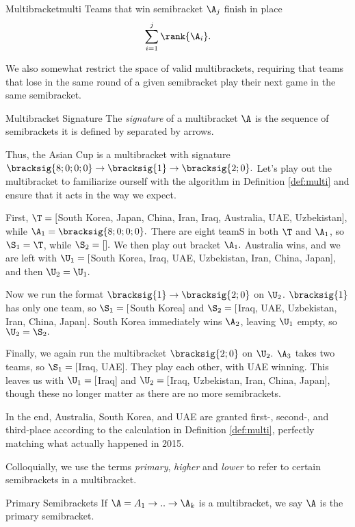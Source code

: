{\begin{definition}{Multibracket}{multi}
        Teams that win semibracket $\A_j$ finish in place $$\sum_{i=1}^{j} \rank{\A_i}.$$

        We also somewhat restrict the space of valid multibrackets, requiring that teams that lose in the same round of a given semibracket play their next game in the same semibracket.
    \end{definition}

    \begin{definition}{Multibracket Signature}{}
        The \textit{signature} of a multibracket $\A$ is the sequence of semibrackets it is defined by separated by arrows.
    \end{definition}

    Thus, the Asian Cup is a multibracket with signature $\bracksig{8;0;0;0} \to \bracksig{1} \to \bracksig{2;0}.$ Let's play out the multibracket to familiarize ourself with the algorithm in Definition \ref{def:multi} and ensure that it acts in the way we expect.

    First, $\T = [$South Korea, Japan, China, Iran, Iraq, Australia, UAE, Uzbekistan], while $\A_1 = \bracksig{8;0;0;0}.$ There are eight teamS in both $\T$ and $\A_1$, so $\S_1 = \T$, while $\S_2 = [].$ We then play out bracket $\A_1.$ Australia wins, and we are left with $\U_1 = [$South Korea, Iraq, UAE, Uzbekistan, Iran, China, Japan], and then $\U_2 = \U_1.$

    Now we run the format $\bracksig{1} \to \bracksig{2;0}$ on $\U_2$. $\bracksig{1}$ has only one team, so $\S_1 =[$South Korea] and $\S_2 =[$Iraq, UAE, Uzbekistan, Iran, China, Japan]. South Korea immediately wins $\A_2$, leaving $\U_1$ empty, so $\U_2 = \S_2.$

    Finally, we again run the multibracket $\bracksig{2;0}$ on $\U_2.$ $\A_3$ takes two teams, so $\S_1 =[$Iraq, UAE]. They play each other, with UAE winning. This leaves us with $\U_1 = [$Iraq] and $\U_2 = [$Iraq, Uzbekistan, Iran, China, Japan], though these no longer matter as there are no more semibrackets.

    In the end, Australia, South Korea, and UAE are granted first-, second-, and third-place according to the calculation in Definition \ref{def:multi}, perfectly matching what actually happened in 2015.

    Colloquially, we use the terms \textit{primary}, \textit{higher} and \textit{lower} to refer to certain semibrackets in a multibracket.

    \begin{definition}{Primary Semibrackets}{}
        If $\A = A_1 \to .. \to \A_k$ is a multibracket, we say $\A$ is the primary semibracket.
    \end{definition}

}
